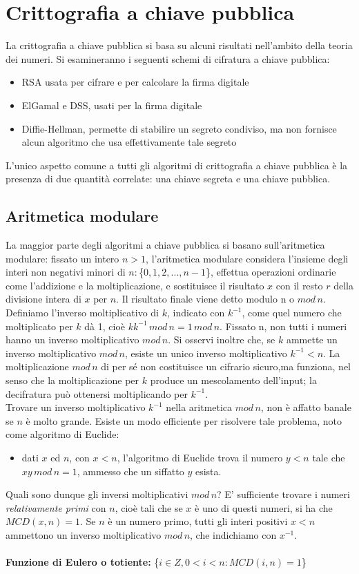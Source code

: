\chapter{Crittografia a chiave pubblica}
La crittografia a chiave pubblica si basa su alcuni risultati nell'ambito della teoria dei numeri. Si esamineranno i seguenti schemi di cifratura a chiave pubblica: \begin{itemize}
\item RSA usata per cifrare e per calcolare la firma digitale
\item ElGamal e DSS, usati per la firma digitale
\item Diffie-Hellman, permette di stabilire un segreto condiviso, ma non fornisce alcun algoritmo che usa effettivamente tale segreto
\end{itemize}
L'unico aspetto comune a tutti gli algoritmi di crittografia a chiave pubblica è la presenza di due quantità correlate: una chiave segreta e una chiave pubblica.
\section{Aritmetica modulare}
La maggior parte degli algoritmi a chiave pubblica si basano sull'aritmetica modulare: fissato un intero $ n>1 $, l'aritmetica modulare considera l'insieme degli interi non negativi minori di
$n: $\{$0, 1, 2,..., n-1$\}, effettua operazioni ordinarie come l'addizione e la moltiplicazione, e sostituisce il risultato $x$ con il resto $r$ della divisione intera di $x$ per $n$. Il risultato finale viene detto modulo n o $mod \, n$. \\
Definiamo l'inverso moltiplicativo di $k$, indicato con $k^{-1}$, come quel numero che moltiplicato per $k$ dà 1, cioè $kk^{-1} \, mod \, n = 1 \, mod \, n$. Fissato n, non tutti i numeri hanno un inverso moltiplicativo $mod \, n$. Si osservi inoltre che, se $k$ ammette un inverso moltiplicativo $mod \, n $, esiste un unico inverso moltiplicativo $k^{-1} < n$. La moltiplicazione $mod \, n$ di per sé non costituisce un cifrario sicuro,ma funziona, nel senso che la moltiplicazione per $k$ produce un mescolamento dell'input; la decifratura può ottenersi moltiplicando per $k^{-1}$.\\ Trovare un inverso moltiplicativo $k^{-1}$ nella aritmetica $mod \, n$, non è affatto banale se $n$ è molto grande. Esiste un modo efficiente per risolvere tale problema, noto come algoritmo di Euclide: \begin{itemize}
\item dati $x$ ed $n$, con $x<n$, l'algoritmo di Euclide trova il
numero $y<n$ tale che $xy \, mod \, n = 1$, ammesso che un siffatto $y$ esista.\end{itemize} 
Quali sono dunque gli inversi moltiplicativi $mod \, n$? E' sufficiente trovare i numeri \textit{relativamente primi} con $n$, cioè tali che se $x$ è uno di questi numeri, si ha che $MCD(x,n) = 1$. Se $n$ è un numero primo, tutti gli interi positivi $x<n$ ammettono un inverso moltiplicativo $mod \, n$, che indichiamo con $x^{-1}$.\\ \\
\textbf{Funzione di Eulero o totiente:} \{$i \in Z, 0 < i < n: MCD(i,n) = 1$\} \\

